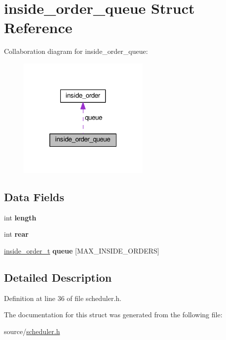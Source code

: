 \hypertarget{structinside__order__queue}{}\section{inside\+\_\+order\+\_\+queue Struct Reference}
\label{structinside__order__queue}


Collaboration diagram for inside\+\_\+order\+\_\+queue\+:\nopagebreak
\begin{figure}[H]
\begin{center}
\leavevmode
\includegraphics[width=181pt]{structinside__order__queue__coll__graph}
\end{center}
\end{figure}
\subsection*{Data Fields}
\begin{DoxyCompactItemize}
\item 
int {\bfseries length}\hypertarget{structinside__order__queue_af25818967b7fcb1153ca2f3b0680526f}{}\label{structinside__order__queue_af25818967b7fcb1153ca2f3b0680526f}

\item 
int {\bfseries rear}\hypertarget{structinside__order__queue_ab8e16f2ab4d7e5563e98981b4f5f0d54}{}\label{structinside__order__queue_ab8e16f2ab4d7e5563e98981b4f5f0d54}

\item 
\hyperlink{structinside__order}{inside\+\_\+order\+\_\+t} {\bfseries queue} \mbox{[}M\+A\+X\+\_\+\+I\+N\+S\+I\+D\+E\+\_\+\+O\+R\+D\+E\+RS\mbox{]}\hypertarget{structinside__order__queue_a4dd512cf1ce8c0f4d5ff0b8cacbfc6cd}{}\label{structinside__order__queue_a4dd512cf1ce8c0f4d5ff0b8cacbfc6cd}

\end{DoxyCompactItemize}


\subsection{Detailed Description}


Definition at line 36 of file scheduler.\+h.



The documentation for this struct was generated from the following file\+:\begin{DoxyCompactItemize}
\item 
source/\hyperlink{scheduler_8h}{scheduler.\+h}\end{DoxyCompactItemize}
